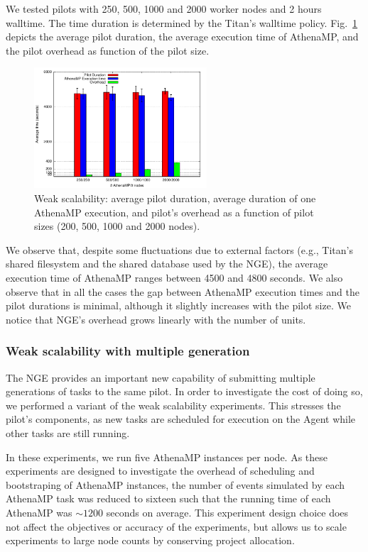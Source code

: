 We tested pilots with 250, 500, 1000 and 2000 worker nodes and 2 hours
walltime. The time duration is determined by the Titan's walltime policy.
Fig.~\ref{fig:weakScal1a} depicts the average pilot duration, the average
execution time of AthenaMP, and the pilot overhead as function of the pilot
size.

\begin{figure}[!t]
    \includegraphics[height=4.5cm,width=\columnwidth]{./figures/NGE/weak1.pdf}
   	\vspace{-0.3in}
    \caption{Weak scalability: average pilot duration, average duration of
    one AthenaMP execution, and pilot's overhead as a function of pilot sizes
    (200, 500, 1000 and 2000 nodes).}\label{fig:weakScal1a}
\end{figure}

We observe that, despite some fluctuations due to external factors (e.g.,
Titan's shared filesystem and the shared database used by the NGE), the
average execution time of AthenaMP ranges between 4500 and 4800 seconds. We
also observe that in all the cases the gap between AthenaMP execution times
and the pilot durations is minimal, although it slightly increases with the
pilot size. We notice that NGE's overhead grows linearly with the number
of units.

\subsubsection{Weak scalability with multiple generation}

The NGE provides an important new capability of submitting multiple
generations of tasks to the same pilot. In order to investigate the cost
of doing so, we performed a variant of the weak scalability experiments. This
stresses the pilot's components, as new tasks are scheduled for execution on
the Agent while other tasks are still running.

In these experiments, we run five AthenaMP instances per node. As these
experiments are designed to investigate the overhead of  scheduling and
bootstraping of AthenaMP instances, the number of events simulated by each
AthenaMP task was reduced to sixteen such that the running time of each
AthenaMP was $\sim 1200$ seconds on average. This experiment design choice
does not affect the objectives or accuracy of the experiments, but allows us
to scale experiments to large node counts by conserving project allocation.

